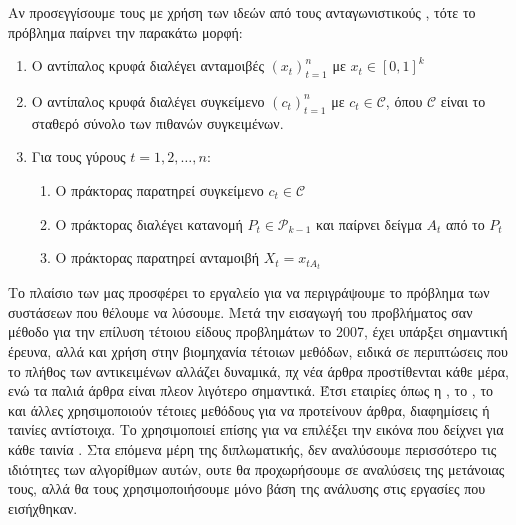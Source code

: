 Αν προσεγγίσουμε τους  με χρήση των ιδεών από τους ανταγωνιστικούς , τότε το πρόβλημα παίρνει την παρακάτω μορφή:

\begin{enumerate}
    \item Ο αντίπαλος κρυφά διαλέγει ανταμοιβές $(x_t)_{t=1}^n$ με $x_t \in [0,1]^k$
    \item Ο αντίπαλος κρυφά διαλέγει συγκείμενο $(c_t)_{t=1}^n$ με $c_t \in \mathcal{C}$, όπου $\mathcal{C}$ είναι το σταθερό σύνολο των πιθανών συγκειμένων.
    \item Για τους γύρους $t=1,2,\ldots,n$:
          \begin{enumerate}
              \item Ο πράκτορας παρατηρεί συγκείμενο  $c_t \in \mathcal{C}$
              \item Ο πράκτορας διαλέγει κατανομή $P_t \in \mathcal{P}_{k-1}$ και παίρνει δείγμα $A_t$  από το $P_t$
              \item Ο πράκτορας παρατηρεί ανταμοιβή $X_t = x_{tA_t}$
          \end{enumerate}
\end{enumerate}

Το πλαίσιο των  μας προσφέρει το εργαλείο για να περιγράψουμε το πρόβλημα των συστάσεων που θέλουμε να λύσουμε. Μετά την εισαγωγή του προβλήματος σαν μέθοδο για την επίλυση τέτοιου είδους προβλημάτων το 2007, έχει υπάρξει σημαντική έρευνα, αλλά και χρήση στην βιομηχανία τέτοιων μεθόδων, ειδικά σε περιπτώσεις που το πλήθος των αντικειμένων αλλάζει δυναμικά, πχ νέα άρθρα προστίθενται κάθε μέρα, ενώ τα παλιά άρθρα είναι πλεον λιγότερο σημαντικά. Έτσι εταιρίες όπως η , το , το  και άλλες χρησιμοποιούν τέτοιες μεθόδους για να προτείνουν άρθρα, διαφημίσεις ή ταινίες αντίστοιχα. Το  χρησιμοποιεί επίσης  για να επιλέξει την εικόνα που δείχνει για κάθε ταινία \cite{blog_artwork_2017}.  Στα επόμενα μέρη της διπλωματικής, δεν αναλύσουμε περισσότερο τις ιδιότητες των αλγορίθμων αυτών, ουτε θα προχωρήσουμε σε αναλύσεις της μετάνοιας τους, αλλά θα τους χρησιμοποιήσουμε μόνο βάση της ανάλυσης στις εργασίες που εισήχθηκαν.

